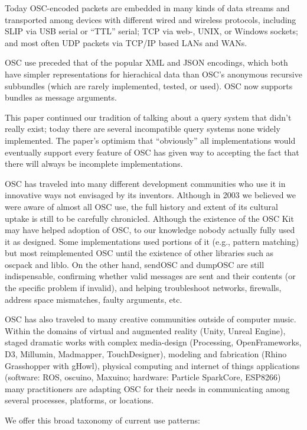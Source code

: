 Today OSC-encoded packets are embedded in many kinds of data streams and transported among devices with different wired and wireless protocols, including SLIP via USB serial or ``TTL'' serial; TCP via web-, UNIX, or Windows sockets; and most often UDP packets via TCP/IP based LANs and WANs. 

OSC use preceded that of the popular XML and JSON encodings, which both have simpler representations for hierachical data than OSC's anonymous recursive subbundles (which are rarely implemented, tested, or used).  OSC now supports bundles as message arguments.

This paper continued our tradition of talking about a query system that didn't really exist;  today there are several incompatible query systems none widely implemented.  The paper's optimism that ``obviously'' all implementations would eventually support every feature of OSC has given way to accepting the fact that there will always be incomplete implementations.

OSC has traveled into many different development communities who use it in innovative ways not envisaged by its inventors. Although in 2003 we believed we were aware of almost all OSC use, the full history and extent of its cultural uptake is still to be carefully chronicled.  Although the existence of the OSC Kit may have helped adoption of OSC, to our knowledge nobody actually fully used it as designed. Some implementations used portions of it (e.g., pattern matching) but most reimplemented OSC until the existence of other libraries such as oscpack and liblo. On the other hand, sendOSC and dumpOSC are still indispensable, confirming whether valid messages are sent and their contents (or the specific problem if invalid), and helping troubleshoot networks, firewalls, address space mismatches, faulty arguments, etc.

OSC has also traveled to many creative communities outside of computer music.  Within the domains of virtual and augmented reality (Unity, Unreal Engine), staged dramatic works with complex media-design (Processing, OpenFrameworks, D3, Millumin, Madmapper, TouchDesigner), modeling and fabrication (Rhino Grasshopper with gHowl), physical computing and internet of things applications (software: ROS, oscuino, Maxuino; hardware: Particle SparkCore, ESP8266) many practitioners are adapting OSC for their needs in communicating among several processes, platforms, or locations.  

We offer this broad taxonomy of current use patterns:


